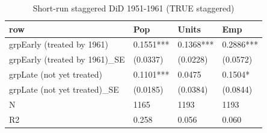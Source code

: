 \begin{table}

\caption{Short-run staggered DiD 1951-1961 (TRUE staggered)}
\centering
\begin{tabular}[t]{llll}
\toprule
row & Pop & Units & Emp\\
\midrule
grpEarly (treated by 1961) & 0.1551*** & 0.1368*** & 0.2886***\\
grpEarly (treated by 1961)\_SE & (0.0337) & (0.0228) & (0.0572)\\
grpLate (not yet treated) & 0.1101*** & 0.0475 & 0.1504*\\
grpLate (not yet treated)\_SE & (0.0185) & (0.0384) & (0.0844)\\
N & 1165 & 1193 & 1193\\
\addlinespace
R2 & 0.258 & 0.056 & 0.060\\
\bottomrule
\end{tabular}
\end{table}
